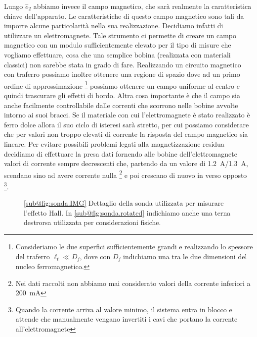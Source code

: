 \documentclass[
    prl,
    reprint, 
    superscriptaddress, 
    altaffilletter, 
    amsmath, 
    amssymb, 
    a4paper,
    varvw]{revtex4-2}
\begin{document}
Lungo $\hat{e}_2$ abbiamo invece il campo magnetico, che sarà realmente la caratteristica chiave dell'apparato. Le caratteristiche di questo campo magnetico sono tali da imporre alcune particolarità nella sua realizzazione. 
Decidiamo infatti di utilizzare un elettromagnete. Tale strumento ci permette di creare un campo magnetico con un modulo sufficientemente elevato per il tipo di misure che vogliamo effettuare, cosa che una semplice bobina (realizzata con materiali classici) non sarebbe stata in grado di fare. Realizzando un circuito magnetico con traferro possiamo inoltre ottenere una regione di spazio dove ad un primo ordine di approssimazione \footnote{Consideriamo le due superfici sufficientemente grandi e realizzando lo spessore del traferro $\ell_t\ll D_j$, dove con $D_j$ indichiamo una tra le due dimensioni del nucleo ferromagnetico.} possiamo ottenere un campo uniforme al centro e quindi trascurare gli effetti di bordo.  Altra cosa importante è che il campo sia anche facilmente controllabile dalle correnti che scorrono nelle bobine avvolte intorno ai suoi bracci. Se il materiale con cui l'elettromagnete è stato realizzato è ferro dolce allora il suo ciclo di isteresi sarà stretto, per cui possiamo considerare che per valori non troppo elevati di corrente la risposta del campo magnetico sia lineare. Per evitare possibili problemi legati alla magnetizzazione residua decidiamo di effettuare la presa dati fornendo alle bobine dell'elettromagnete valori di corrente sempre decrescenti che, partendo da un valore di \SI{1.2}{\ampere}/\SI{1.3}{\ampere}, scendano sino ad avere corrente nulla \footnote{Nei dati raccolti non abbiamo mai considerato valori della corrente inferiori a \SI{200}{\milli\ampere}} e poi crescano di nuovo in verso opposto \footnote{Quando la corrente arriva al valore minimo, il sistema entra in blocco e attende che manualmente vengano invertiti i cavi che portano la corrente all'elettromagnete}.

\begin{figure}
    \hspace{5mm}
    \caption{\ref{sub@fig:sonda.IMG} Dettaglio della sonda utilizzata per misurare l'effetto Hall. In \ref{sub@fig:sonda.rotated} indichiamo anche una terna destrorsa utilizzata per considerazioni fisiche. }\label{fig:misc}
\end{figure}
\end{document}
